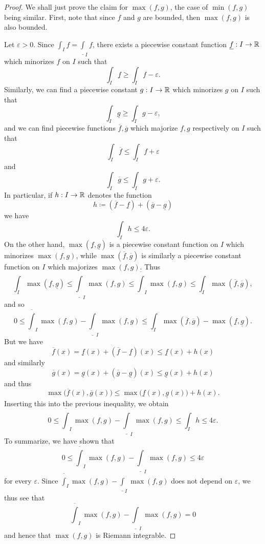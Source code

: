 \begin{proof}
  We shall just prove the claim for \(\max(f, g)\), the case of \(\min(f, g)\) being similar.
  First, note that since \(f\) and \(g\) are bounded, then \(\max(f, g)\) is also bounded.

  Let \(\varepsilon > 0\).
  Since \(\int_I f = \underline{\int}_I f\), there exists a piecewise constant function \(\underline{f} : I \to \mathbb{R}\) which minorizes \(f\) on \(I\) such that
  \[
    \int_I \underline{f} \geq \int_I f - \varepsilon.
  \]
  Similarly, we can find a piecewise constant \(g : I \to \mathbb{R}\) which minorizes \(g\) on \(I\) such that
  \[
    \int_I \underline{g} \geq \int_I g - \varepsilon,
  \]
  and we can find piecewise functions \(\overline{f}, \overline{g}\) which majorize \(f, g\) respectively on \(I\) such that
  \[
    \int_I \overline{f} \leq \int_I f + \varepsilon
  \]
  and
  \[
    \int_I \overline{g} \leq \int_I g + \varepsilon.
  \]
  In particular, if \(h : I \to \mathbb{R}\) denotes the function
  \[
    h \coloneqq (\overline{f} - \underline{f}) + (\overline{g} - \underline{g})
  \]
  we have
  \[
    \int_I h \leq 4 \varepsilon.
  \]
  On the other hand, \(\max(\underline{f}, \underline{g})\) is a piecewise constant function on \(I\) which minorizes \(\max(f, g)\), while \(\max(\overline{f}, \overline{g})\) is similarly a piecewise constant function on \(I\) which majorizes \(\max(f, g)\).
  Thus
  \[
    \int_I \max(\underline{f}, \underline{g}) \leq \underline{\int}_I \max(f, g) \leq \overline{\int}_I \max(f, g) \leq \int_I \max(\overline{f}, \overline{g}),
  \]
  and so
  \[
    0 \leq \overline{\int}_I \max(f, g) - \underline{\int}_I \max(f, g) \leq \int_I \max(\overline{f}, \overline{g}) - \max(\underline{f}, \underline{g}).
  \]
  But we have
  \[
    \overline{f}(x) = \underline{f}(x) + (\overline{f} - \underline{f})(x) \leq \underline{f}(x) + h(x)
  \]
  and similarly
  \[
    \overline{g}(x) = \underline{g}(x) + (\overline{g} - \underline{g})(x) \leq \underline{g}(x) + h(x)
  \]
  and thus
  \[
    \max\big(\overline{f}(x), \overline{g}(x)\big) \leq \max\big(\underline{f}(x), \underline{g}(x)\big) + h(x).
  \]
  Inserting this into the previous inequality, we obtain
  \[
    0 \leq \overline{\int}_I \max(f, g) - \underline{\int}_I \max(f, g) \leq \int_I h \leq 4 \varepsilon.
  \]
  To summarize, we have shown that
  \[
    0 \leq \overline{\int}_I \max(f, g) - \underline{\int}_I \max(f, g) \leq 4 \varepsilon
  \]
  for every \(\varepsilon\).
  Since \(\overline{\int}_I \max(f, g) - \underline{\int}_I \max(f, g)\) does not depend on \(\varepsilon\), we thus see that
  \[
    \overline{\int}_I \max(f, g) - \underline{\int}_I \max(f, g) = 0
  \]
  and hence that \(\max(f, g)\) is Riemann integrable.
\end{proof}

